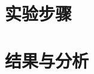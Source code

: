 \documentclass[12pt,UTF8]{ctexart}
\begin{document}
\begin{spacing}{1.1}








\section{实验步骤}




\section{结果与分析}

% 


\end{spacing}
\end{document}
